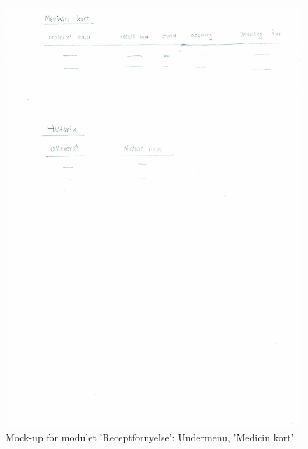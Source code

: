 \begin{figure}[H]
	\centering
	\includegraphics[angle=0, height=0.2\textheight]{Materials/FornyRecept_Medicinkort.pdf}
	\caption{Mock-up for modulet 'Receptfornyelse': Undermenu, 'Medicin kort'}
	\label{fig:Mock-Up}
\end{figure}
